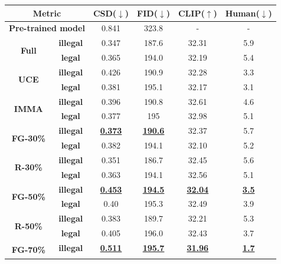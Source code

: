 \documentclass{article}
\begin{document}
\begin{table}[ht]
	\centering
	{\fontsize{9}{9}\selectfont
		\begin{tabular}{cccccc}
			\toprule
			\multicolumn{2}{c}{\textbf{Metric}} & \textbf{CSD($\downarrow$)} & \textbf{FID($\downarrow$)} &\textbf{CLIP($\uparrow$)}& \textbf{Human($\downarrow$)}\\
			\midrule[1pt]
			\multicolumn{2}{c}{\textbf{Pre-trained model}} &0.841& 323.8 &-&- \\ \midrule[1pt]
			\multirow{2}{*}{\textbf{Full}}
			&\textbf{illegal}&0.347&187.6&32.31&5.9  \\ \cmidrule(ll){2-6}
			&\textbf{legal}&0.365&194.0&32.19&5.4 \\  \midrule[1pt]
			\multirow{2}{*}{\textbf{UCE}}
			&\textbf{illegal}&0.426& 190.9&32.28&3.3 \\ \cmidrule(ll){2-6}
			&\textbf{legal}&0.381&195.1 &32.17&3.1 \\  \midrule[1pt]
			\multirow{2}{*}{\textbf{IMMA}}
			&\textbf{illegal}&0.396&190.8&32.61&4.6 \\ \cmidrule(ll){2-6}
			&\textbf{legal}&0.377&195&32.98&5.1  \\  \midrule[1pt]
			\multirow{2}{*}{\textbf{FG-30\%}}
			&\textbf{illegal}&\textbf{\underline{0.373}}&\textbf{\underline{190.6}}&32.37&5.7  \\ \cmidrule(ll){2-6}
			&\textbf{legal}&0.382&194.1&32.10&5.2  \\  \midrule[1pt]
			\multirow{2}{*}{\textbf{R-30\%}}
			&\textbf{illegal}&0.351&186.7 &32.45&5.6 \\ \cmidrule(ll){2-6}
			&\textbf{legal}&0.363&194.1&32.56&5.1  \\  \midrule[1pt]
			\multirow{2}{*}{\textbf{FG-50\%}}
			&\textbf{illegal}&\textbf{\underline{0.453}}&\textbf{\underline{194.5}} &\textbf{\underline{32.04}}&\textbf{\underline{3.5}} \\ \cmidrule(ll){2-6}
			&\textbf{legal}&0.40&195.3 &32.49&3.9 \\ \midrule[1pt]
			\multirow{2}{*}{\textbf{R-50\%}}
			&\textbf{illegal}&0.383&189.7 &32.21&5.3 \\ \cmidrule(ll){2-6}
			&\textbf{legal}&0.405&196.0 &32.43&3.7 \\  \midrule[1pt]
			\multirow{2}{*}{\textbf{FG-70\%}}
			&\textbf{illegal}&\textbf{\underline{0.511}}&\textbf{\underline{195.7}}&\textbf{\underline{31.96}}&\textbf{\underline{1.7}} \\ \cmidrule(ll){2-6}

\end{tabular}}
\end{table}
\end{document}
